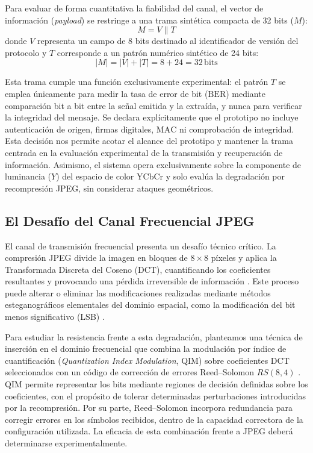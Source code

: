 \documentclass[IB]{TFUOC}%
\begin{document}
Para evaluar de forma cuantitativa la fiabilidad del canal, el vector de información (\textit{payload}) se restringe a una trama sintética compacta de 32 bits ($M$):
\begin{equation}
M = V \parallel T
\end{equation}
donde $V$ representa un campo de 8 bits destinado al identificador de versión del protocolo y $T$ corresponde a un patrón numérico sintético de 24 bits:
\begin{equation}
|M| = |V| + |T| = 8 + 24 = 32\,\text{bits}
\end{equation}

Esta trama cumple una función exclusivamente experimental: el patrón $T$ se emplea únicamente para medir la tasa de error de bit ($\mathrm{BER}$) mediante comparación bit a bit entre la señal emitida y la extraída, y nunca para verificar la integridad del mensaje. Se declara explícitamente que el prototipo no incluye autenticación de origen, firmas digitales, $\mathrm{MAC}$ ni comprobación de integridad. Esta decisión nos permite acotar el alcance del prototipo y mantener la trama centrada en la evaluación experimental de la transmisión y recuperación de información. Asimismo, el sistema opera exclusivamente sobre la componente de luminancia ($Y$) del espacio de color YCbCr y solo evalúa la degradación por recompresión JPEG, sin considerar ataques geométricos.

\subsection{El Desafío del Canal Frecuencial JPEG}
El canal de transmisión frecuencial presenta un desafío técnico crítico. La compresión JPEG divide la imagen en bloques de $8 \times 8$ píxeles y aplica la Transformada Discreta del Coseno (DCT), cuantificando los coeficientes resultantes y provocando una pérdida irreversible de información \cite{10}. Este proceso puede alterar o eliminar las modificaciones realizadas mediante métodos esteganográficos elementales del dominio espacial, como la modificación del bit menos significativo (LSB) \cite{3}.

Para estudiar la resistencia frente a esta degradación, planteamos una técnica de inserción en el dominio frecuencial que combina la modulación por índice de cuantificación (\textit{Quantization Index Modulation}, QIM)\cite{11} sobre coeficientes DCT seleccionados con un código de corrección de errores Reed--Solomon $RS(8,4)$ \cite{reed1960}. QIM permite representar los bits mediante regiones de decisión definidas sobre los coeficientes, con el propósito de tolerar determinadas perturbaciones introducidas por la recompresión. Por su parte, Reed--Solomon incorpora redundancia para corregir errores en los símbolos recibidos, dentro de la capacidad correctora de la configuración utilizada. La eficacia de esta combinación frente a JPEG deberá determinarse experimentalmente.
\end{document}
